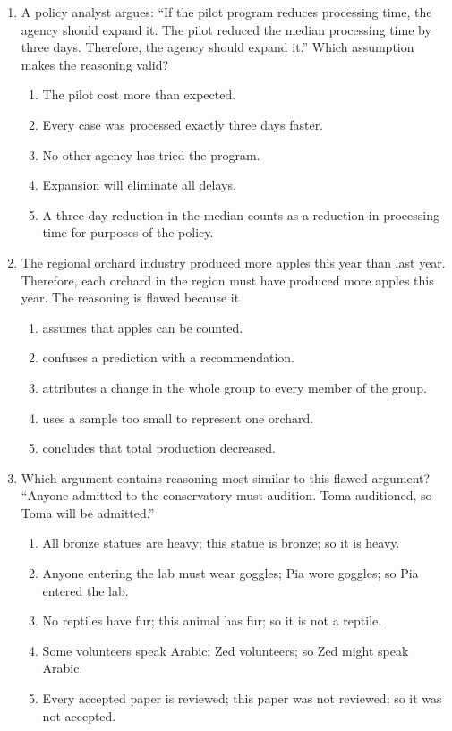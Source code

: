 \begin{enumerate}
\item A policy analyst argues: ``If the pilot program reduces processing time,
the agency should expand it. The pilot reduced the median processing time by
three days. Therefore, the agency should expand it.'' Which assumption makes the
reasoning valid?
  \begin{enumerate}
  \item The pilot cost more than expected.
  \item Every case was processed exactly three days faster.
  \item No other agency has tried the program.
  \item Expansion will eliminate all delays.
  \item A three-day reduction in the median counts as a reduction in processing
        time for purposes of the policy.
  \end{enumerate}

\item The regional orchard industry produced more apples this year than last
year. Therefore, each orchard in the region must have produced more apples this
year. The reasoning is flawed because it
  \begin{enumerate}
  \item assumes that apples can be counted.
  \item confuses a prediction with a recommendation.
  \item attributes a change in the whole group to every member of the group.
  \item uses a sample too small to represent one orchard.
  \item concludes that total production decreased.
  \end{enumerate}

\item Which argument contains reasoning most similar to this flawed argument?
``Anyone admitted to the conservatory must audition. Toma auditioned, so Toma
will be admitted.''
  \begin{enumerate}
  \item All bronze statues are heavy; this statue is bronze; so it is heavy.
  \item Anyone entering the lab must wear goggles; Pia wore goggles; so Pia
        entered the lab.
  \item No reptiles have fur; this animal has fur; so it is not a reptile.
  \item Some volunteers speak Arabic; Zed volunteers; so Zed might speak Arabic.
  \item Every accepted paper is reviewed; this paper was not reviewed; so it was
        not accepted.
  \end{enumerate}


\end{enumerate}
